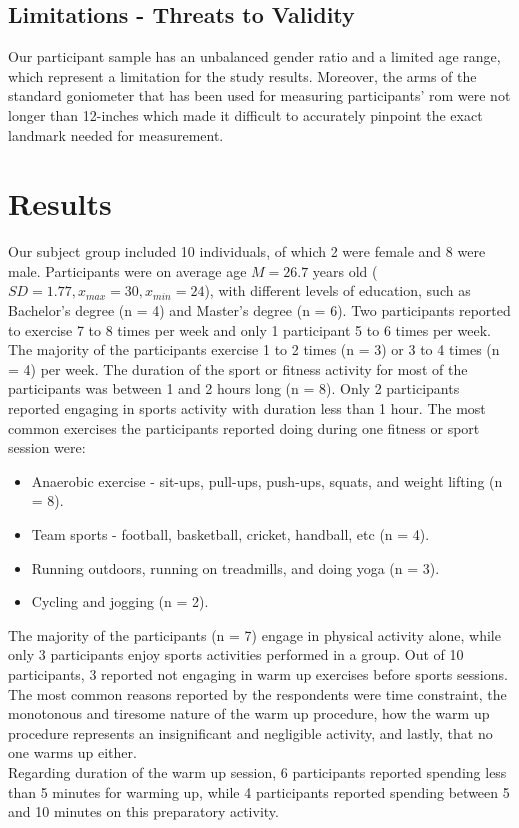 \subsection{Limitations - Threats to Validity}
Our participant sample has an unbalanced gender ratio and a limited age range, which represent a limitation for the study results. Moreover, the arms of the standard goniometer that has been used for measuring participants' \acrshort{rom} were not longer than 12-inches which made it difficult to accurately pinpoint the exact landmark needed for measurement. %
\section{Results}
Our subject group included 10 individuals, of which 2 were female and 8 were male. Participants were on average age \begin{math}M = 26.7\end{math} years old (\begin{math}SD= 1.77,  x_{max}=30 ,x_{min}= 24 \end{math}), with different levels of education, such as Bachelor's degree (n = 4) and Master's degree (n = 6). Two participants reported to exercise 7 to 8 times per week and only 1 participant 5 to 6 times per week. The majority of the participants exercise 1 to 2 times (n = 3) or 3 to 4 times (n = 4) per week. The duration of the sport or fitness activity for most of the participants was between 1 and 2 hours long (n = 8). Only 2 participants reported engaging in sports activity with duration less than 1 hour. The most common exercises the participants reported doing during one fitness or sport session were:
\begin{itemize}
\item Anaerobic exercise - sit-ups, pull-ups, push-ups, squats, and weight lifting (n = 8).
\item Team sports - football, basketball, cricket, handball, etc (n = 4).
\item Running outdoors, running on treadmills, and doing yoga (n = 3).
\item Cycling and jogging (n = 2).
\end{itemize}
The majority of the participants (n = 7) engage in physical activity alone, while only 3 participants enjoy sports activities performed in a group. Out of 10 participants, 3 reported not engaging in warm up exercises before sports sessions. The most common reasons reported by the respondents were time constraint, the monotonous and tiresome nature of the warm up procedure, how the warm up procedure represents an insignificant and negligible activity, and lastly, that no one warms up either.\\ Regarding duration of the warm up session, 6 participants reported spending less than 5 minutes for warming up, while 4 participants reported spending between 5 and 10 minutes on this preparatory activity.\\
